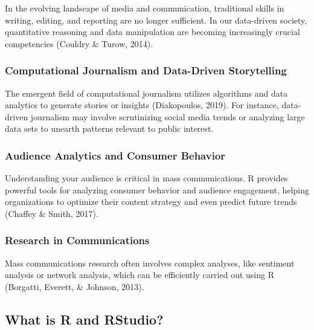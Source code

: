 \documentclass[
  b5paper]{book}
\begin{document}
In the evolving landscape of media and communication, traditional skills in writing, editing, and reporting are no longer sufficient. In our data-driven society, quantitative reasoning and data manipulation are becoming increasingly crucial competencies (Couldry \& Turow, 2014).

\hypertarget{computational-journalism-and-data-driven-storytelling}{%
\subsubsection*{Computational Journalism and Data-Driven Storytelling}\label{computational-journalism-and-data-driven-storytelling}}

The emergent field of computational journalism utilizes algorithms and data analytics to generate stories or insights (Diakopoulos, 2019). For instance, data-driven journalism may involve scrutinizing social media trends or analyzing large data sets to unearth patterns relevant to public interest.

\hypertarget{audience-analytics-and-consumer-behavior}{%
\subsubsection*{Audience Analytics and Consumer Behavior}\label{audience-analytics-and-consumer-behavior}}

Understanding your audience is critical in mass communications. R provides powerful tools for analyzing consumer behavior and audience engagement, helping organizations to optimize their content strategy and even predict future trends (Chaffey \& Smith, 2017).

\hypertarget{research-in-communications}{%
\subsubsection*{Research in Communications}\label{research-in-communications}}

Mass communications research often involves complex analyses, like sentiment analysis or network analysis, which can be efficiently carried out using R (Borgatti, Everett, \& Johnson, 2013).

\hypertarget{what-is-r-and-rstudio}{%
\subsection*{What is R and RStudio?}\label{what-is-r-and-rstudio}}
\end{document}
